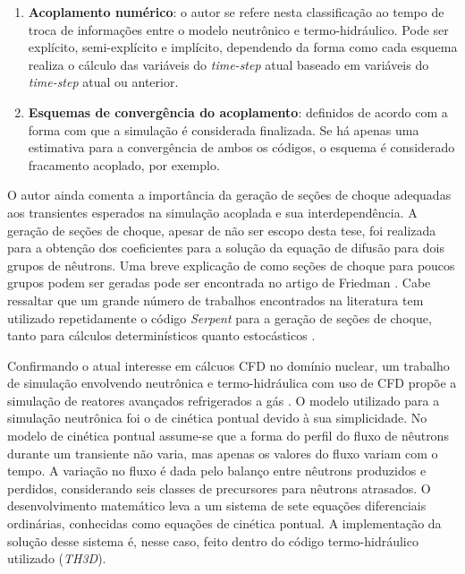 \begin{enumerate}
\item \textbf{Acoplamento numérico}: o autor se refere nesta classificação ao tempo de troca de informações entre o modelo 
neutrônico e termo-hidráulico. Pode ser explícito, semi-explícito e implícito, dependendo da forma como cada esquema 
realiza o cálculo das variáveis do \textit{time-step} atual baseado em variáveis do \textit{time-step} atual ou 
anterior.
\item \textbf{Esquemas de convergência do acoplamento}: definidos de acordo com a forma com que a simulação é considerada 
finalizada. Se há apenas uma estimativa para a convergência de ambos os códigos, o esquema é considerado fracamento 
acoplado, por exemplo.
\end{enumerate}

O autor ainda comenta a importância da geração de seções de choque adequadas aos transientes esperados na 
simulação acoplada e sua interdependência. A geração de seções de choque, apesar de não ser escopo desta tese,
foi realizada para a obtenção dos coeficientes para a solução da equação de difusão para dois grupos de nêutrons.
Uma breve explicação de como seções de choque para poucos grupos podem ser geradas pode ser encontrada no
artigo de Friedman \cite{Friedman2013}. Cabe ressaltar que um grande número de trabalhos encontrados
na literatura tem utilizado repetidamente o código \textit{Serpent} \cite{Serpent2013} para
a geração de seções de choque, tanto para cálculos determinísticos quanto estocásticos \cite{Jareteg2014, Dorval2015}.

Confirmando o atual interesse em cálcuos CFD no domínio nuclear, um trabalho de simulação envolvendo
neutrônica e termo-hidráulica com uso de CFD propõe a simulação de reatores avançados refrigerados
a gás \cite{Hossain2011}. O modelo utilizado 
para a simulação neutrônica foi o de cinética pontual devido à sua simplicidade. No modelo 
de cinética pontual assume-se que a forma do perfil do fluxo de nêutrons durante um transiente 
não varia, mas apenas os valores do fluxo variam com o tempo. A variação no fluxo é dada 
pelo balanço entre nêutrons produzidos e perdidos, considerando seis classes de precursores 
para nêutrons atrasados. O desenvolvimento matemático leva a um sistema de sete equações diferenciais 
ordinárias, conhecidas como equações de cinética pontual. A implementação da solução desse sistema 
é, nesse caso, feito dentro do código termo-hidráulico utilizado (\textit{TH3D}).


